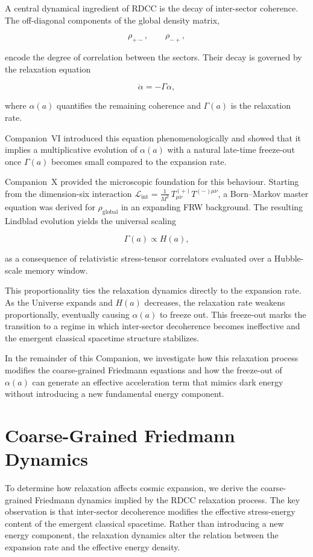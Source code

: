 \documentclass[11pt,a4paper]{article}
\newcommand{\rglobal}{\rho_{\mathrm{global}}}
\newcommand{\rpm}{\rho_{+-}}
\newcommand{\rmp}{\rho_{-+}}
\newcommand{\LintDef}{\mathcal{L}_{\mathrm{int}} = \frac{1}{M^{2}}\, T^{(+)}_{\mu\nu} T^{(-)\mu\nu}}
\newcommand{\Ha}{H(a)}
\newcommand{\GammaR}{\Gamma}
\newcommand{\alphaR}{\alpha}
\newcommand{\RelaxEq}{\dot{\alpha} = -\Gamma \alpha}
\begin{document}
A central dynamical ingredient of RDCC is the decay of inter-sector coherence.
The off-diagonal components of the global density matrix,


\[
\rpm, \qquad \rmp,
\]


encode the degree of correlation between the sectors. Their decay is governed by
the relaxation equation


\[
\RelaxEq,
\]


where $\alphaR(a)$ quantifies the remaining coherence and $\GammaR(a)$ is the
relaxation rate.

Companion~VI introduced this equation phenomenologically and showed that it
implies a multiplicative evolution of $\alphaR(a)$ with a natural late-time
freeze-out once $\GammaR(a)$ becomes small compared to the expansion rate.

Companion~X provided the microscopic foundation for this behaviour. Starting
from the dimension-six interaction $\LintDef$, a Born--Markov master equation
was derived for $\rglobal$ in an expanding FRW background. The resulting
Lindblad evolution yields the universal scaling


\[
\GammaR(a) \propto \Ha,
\]


as a consequence of relativistic stress-tensor correlators evaluated over a
Hubble-scale memory window.

This proportionality ties the relaxation dynamics directly to the expansion
rate. As the Universe expands and $\Ha$ decreases, the relaxation rate weakens
proportionally, eventually causing $\alphaR(a)$ to freeze out. This freeze-out
marks the transition to a regime in which inter-sector decoherence becomes
ineffective and the emergent classical spacetime structure stabilizes.

In the remainder of this Companion, we investigate how this relaxation process
modifies the coarse-grained Friedmann equations and how the freeze-out of
$\alphaR(a)$ can generate an effective acceleration term that mimics dark energy
without introducing a new fundamental energy component.


\section{Coarse-Grained Friedmann Dynamics}

To determine how relaxation affects cosmic expansion, we derive the
coarse-grained Friedmann dynamics implied by the RDCC relaxation process. The
key observation is that inter-sector decoherence modifies the effective
stress-energy content of the emergent classical spacetime. Rather than
introducing a new energy component, the relaxation dynamics alter the relation
between the expansion rate and the effective energy density.
\end{document}

